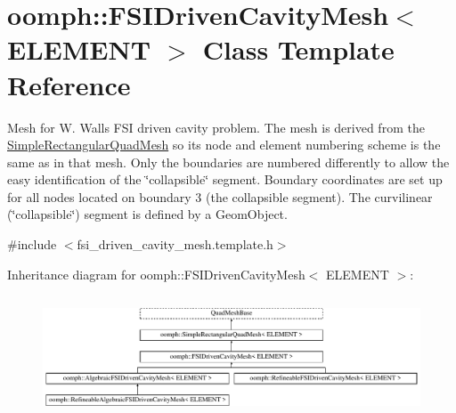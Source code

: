 \hypertarget{classoomph_1_1FSIDrivenCavityMesh}{}\section{oomph\+:\+:F\+S\+I\+Driven\+Cavity\+Mesh$<$ E\+L\+E\+M\+E\+NT $>$ Class Template Reference}
\label{classoomph_1_1FSIDrivenCavityMesh}


Mesh for W. Wall\textquotesingle{}s F\+SI driven cavity problem. The mesh is derived from the {\ttfamily \hyperlink{classoomph_1_1SimpleRectangularQuadMesh}{Simple\+Rectangular\+Quad\+Mesh}} so it\textquotesingle{}s node and element numbering scheme is the same as in that mesh. Only the boundaries are numbered differently to allow the easy identification of the \char`\"{}collapsible\char`\"{} segment. Boundary coordinates are set up for all nodes located on boundary 3 (the collapsible segment). The curvilinear (\char`\"{}collapsible\char`\"{}) segment is defined by a {\ttfamily Geom\+Object}.  




{\ttfamily \#include $<$fsi\+\_\+driven\+\_\+cavity\+\_\+mesh.\+template.\+h$>$}

Inheritance diagram for oomph\+:\+:F\+S\+I\+Driven\+Cavity\+Mesh$<$ E\+L\+E\+M\+E\+NT $>$\+:\begin{figure}[H]
\begin{center}
\leavevmode
\includegraphics[height=3.645833cm]{classoomph_1_1FSIDrivenCavityMesh}
\end{center}
\end{figure}
